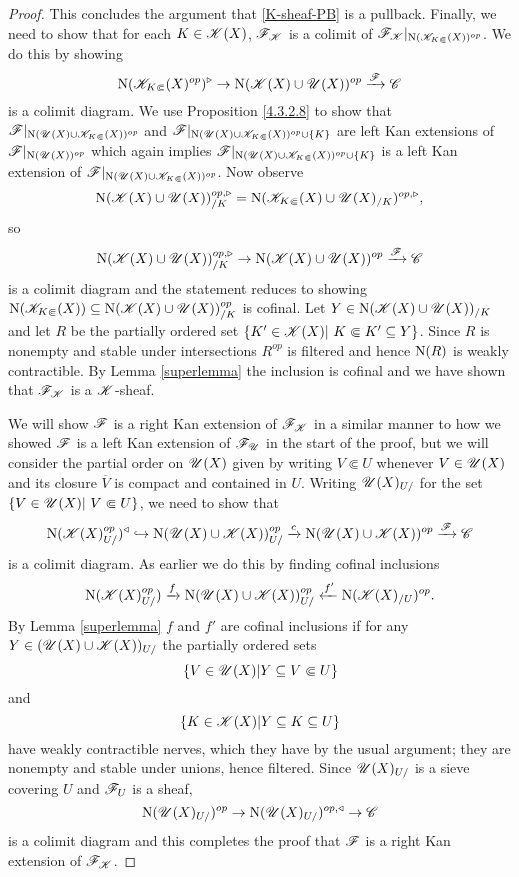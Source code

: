 \documentclass[../thesis.tex]{subfiles}
\begin{document}
\begin{proof}
    This concludes the argument that \ref{K-sheaf-PB} is a pullback.
    Finally, we need to show that for each $K \in \mathscr{K}(X)$, $\mathscr{F}_{\mathscr{K}}$ is a colimit of $\mathscr{F}_{\mathscr{K}}|_{\mathrm{N}(\mathscr{K}_{K\Subset}(X))^{op}}$.
    We do this by showing
    \[
        \mathrm{N}(\mathscr{K}_{K\Subset}(X)^{op})^{\triangleright} \to \mathrm{N}(\mathscr{K}(X) \cup \mathscr{U}(X))^{op} \xrightarrow{\mathscr{F}} \mathscr{C}
    \]
    is a colimit diagram.
    We use Proposition \ref{4.3.2.8} to show that
    $\mathscr{F}|_{\mathrm{N}(\mathscr{U}(X) \cup \mathscr{K}_{K\Subset}(X))^{op}}$ and ${\mathscr{F}|_{\mathrm{N}(\mathscr{U}(X) \cup \mathscr{K}_{K\Subset}(X))^{op} \cup \{K\}}}$ are left Kan extensions of $\mathscr{F}|_{\mathrm{N}(\mathscr{U}(X))^{op}}$ which again implies $\mathscr{F}|_{\mathrm{N}(\mathscr{U}(X) \cup \mathscr{K}_{K\Subset}(X))^{op} \cup \{K\}}$ is a left Kan extension of $\mathscr{F}|_{\mathrm{N}(\mathscr{U}(X) \cup \mathscr{K}_{K\Subset}(X))^{op}}$.
    Now observe
    \[
        \mathrm{N}(\mathscr{K}(X) \cup \mathscr{U}(X))^{op,\triangleright}_{/K} = \mathrm{N}(\mathscr{K}_{K\Subset}(X) \cup \mathscr{U}(X)_{/K})^{op,\triangleright},
    \]
    so
    \[
        \mathrm{N}(\mathscr{K}(X) \cup \mathscr{U}(X))^{op,\triangleright}_{/K} \to \mathrm{N}(\mathscr{K}(X) \cup \mathscr{U}(X))^{op} \xrightarrow{\mathscr{F}} \mathscr{C}
    \]
    is a colimit diagram and the statement reduces to showing $\mathrm{N}(\mathscr{K}_{K\Subset}(X)) \subseteq \mathrm{N}(\mathscr{K}(X) \cup \mathscr{U}(X))_{/K}^{op}$ is cofinal.
    Let $Y\in \mathrm{N}(\mathscr{K}(X) \cup \mathscr{U}(X))_{/K}$ and let $R$ be the partially ordered set $\{K' \in \K(X) | K \Subset K ' \subseteq Y\}$.
    Since $R$ is nonempty and stable under intersections $R^{op}$ is filtered and hence $\mathrm{N}(R)$ is weakly contractible.
    By Lemma \ref{superlemma} the inclusion is cofinal and we have shown that $\mathscr{F}_{\mathscr{K}}$ is a $\mathscr{K}$-sheaf.

    We will show $\mathscr{F}$ is a right Kan extension of $\mathscr{F}_{\mathscr{K}}$ in a similar manner to how we showed $\mathscr{F}$ is a left Kan extension of $\mathscr{F}_{\mathscr{U}}$ in the start of the proof, but we will consider the partial order on $\mathscr{U}(X)$ given by writing $V\Subset U$ whenever $V\in \mathscr{U}(X)$ and its closure $\overline{V}$ is compact and contained in $U$.
    Writing $\mathscr{U}(X)_{U/}$ for the set $\{V\in \Open(X) | V\Subset U\}$, we need to show that
    \[
        \mathrm{N}(\mathscr{K}(X)_{U/}^{op})^{\triangleleft} \hookrightarrow \mathrm{N}(\mathscr{U}(X) \cup \mathscr{K}(X))_{U/}^{op} \xrightarrow{c}\mathrm{N}(\mathscr{U}(X) \cup \mathscr{K}(X))^{op} \xrightarrow{\mathscr{F}} \mathscr{C}
    \]
    is a colimit diagram.
    As earlier we do this by finding cofinal inclusions
    \[
        \mathrm{N}(\mathscr{K}(X)_{U/}^{op}) \xrightarrow{f}\mathrm{N}(\mathscr{U}(X) \cup \mathscr{K}(X))_{U/}^{op} \xleftarrow{f'} \mathrm{N}(\mathscr{K}(X)_{/U})^{op}.
    \]
    By Lemma \ref{superlemma} $f$ and $f'$ are cofinal inclusions if for any $Y\in (\mathscr{U}(X) \cup \mathscr{K}(X))_{U/}$ the partially ordered sets
    \[
        \{ V \in \mathscr{U}(X) |Y \subseteq V \Subset U \}
    \]
    and
    \[
        \{ K \in \mathscr{K}(X) |Y \subseteq K \subseteq U \}
    \]
    have weakly contractible nerves, which they have by the usual argument; they are nonempty and stable under unions, hence filtered.
    Since $\mathscr{U}(X)_{U/}$ is a sieve covering $U$ and $\mathscr{F}_U$ is a sheaf,
    \[
        \mathrm{N}(\mathscr{U}(X)_{U/})^{op} \to \mathrm{N}(\mathscr{U}(X)_{U/})^{op, \triangleleft} \to \mathscr{C}
    \]
    is a colimit diagram and this completes the proof that $\mathscr{F}$ is a right Kan extension of $\mathscr{F}_{\mathscr{K}}$.
\end{proof}
\end{document}
